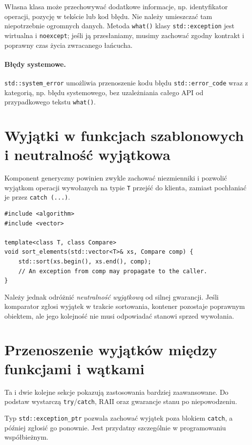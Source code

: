 Własna klasa może przechowywać dodatkowe informacje, np. identyfikator
operacji, pozycję w tekście lub kod błędu. Nie należy umieszczać tam
niepotrzebnie ogromnych danych. Metoda \texttt{what()} klasy
\texttt{std::exception} jest wirtualna i \texttt{noexcept}; jeśli
ją przesłaniamy, musimy zachować zgodny kontrakt i poprawny czas życia
zwracanego łańcucha.

\paragraph{Błędy systemowe.}
\texttt{std::system\_error} umożliwia przenoszenie kodu błędu
\texttt{std::error\_code} wraz z kategorią, np. błędu systemowego,
bez uzależniania całego API od przypadkowego tekstu \texttt{what()}.

\section{Wyjątki w funkcjach szablonowych i neutralność wyjątkowa}

Komponent generyczny powinien zwykle zachować niezmienniki i pozwolić
wyjątkom operacji wywołanych na typie \texttt{T} przejść do klienta,
zamiast pochłaniać je przez \texttt{catch (...)}.

\begin{lstlisting}
#include <algorithm>
#include <vector>

template<class T, class Compare>
void sort_elements(std::vector<T>& xs, Compare comp) {
    std::sort(xs.begin(), xs.end(), comp);
    // An exception from comp may propagate to the caller.
}
\end{lstlisting}

Należy jednak odróżnić \emph{neutralność wyjątkową} od silnej
gwarancji. Jeśli komparator zgłosi wyjątek w trakcie sortowania,
kontener pozostaje poprawnym obiektem, ale jego kolejność nie musi
odpowiadać stanowi sprzed wywołania.

\section{Przenoszenie wyjątków między funkcjami i wątkami}
\label{sec:cpp11-exception-ptr}

Ta i dwie kolejne sekcje pokazują zastosowania bardziej zaawansowane.
Do podstaw wystarczą \texttt{try}/\texttt{catch}, RAII oraz gwarancje
stanu po niepowodzeniu.

Typ \texttt{std::exception\_ptr} pozwala zachować wyjątek poza blokiem
\texttt{catch}, a później zgłosić go ponownie. Jest przydatny
szczególnie w programowaniu współbieżnym.

